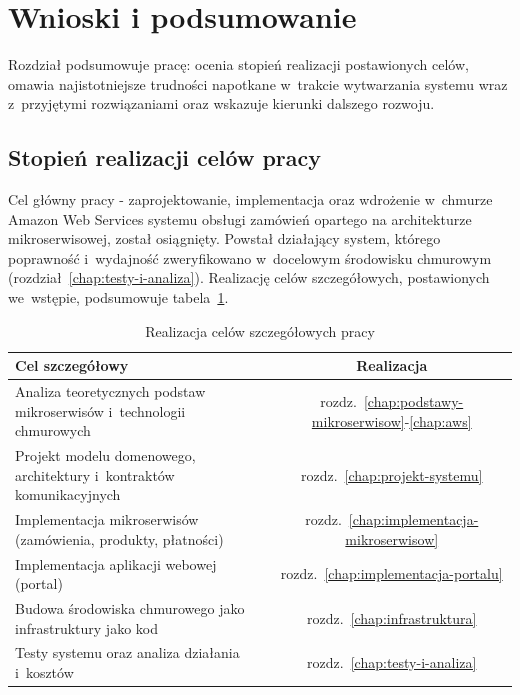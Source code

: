 \chapter*{Wnioski i podsumowanie}
{}
\label{chap:wnioski}

Rozdział podsumowuje pracę: ocenia stopień realizacji postawionych celów, omawia najistotniejsze trudności
napotkane w~trakcie wytwarzania systemu wraz z~przyjętymi rozwiązaniami oraz wskazuje kierunki dalszego rozwoju.

\section*{Stopień realizacji celów pracy}
{}
\label{sec:stopien-realizacji-celow}

Cel główny pracy - zaprojektowanie, implementacja oraz wdrożenie w~chmurze Amazon Web Services systemu obsługi
zamówień opartego na architekturze mikroserwisowej, został osiągnięty. Powstał działający system, którego
poprawność i~wydajność zweryfikowano w~docelowym środowisku chmurowym (rozdział~\ref{chap:testy-i-analiza}).
Realizację celów szczegółowych, postawionych we~wstępie, podsumowuje
tabela~\ref{tab:realizacja-celow}.

\begin{table}[H]
    \centering
    \caption{Realizacja celów szczegółowych pracy}
    \label{tab:realizacja-celow}
    \begin{tabular}{p{10.5cm}c}
        \toprule
        \textbf{Cel szczegółowy} & \textbf{Realizacja} \\
        \midrule
        Analiza teoretycznych podstaw mikroserwisów i~technologii chmurowych & rozdz.\ \ref{chap:podstawy-mikroserwisow}-\ref{chap:aws} \\
        Projekt modelu domenowego, architektury i~kontraktów komunikacyjnych & rozdz.\ \ref{chap:projekt-systemu} \\
        Implementacja mikroserwisów (zamówienia, produkty, płatności) & rozdz.\ \ref{chap:implementacja-mikroserwisow} \\
        Implementacja aplikacji webowej (portal) & rozdz.\ \ref{chap:implementacja-portalu} \\
        Budowa środowiska chmurowego jako infrastruktury jako kod & rozdz.\ \ref{chap:infrastruktura} \\
        Testy systemu oraz analiza działania i~kosztów & rozdz.\ \ref{chap:testy-i-analiza} \\
        \bottomrule
    \end{tabular}
\end{table}

